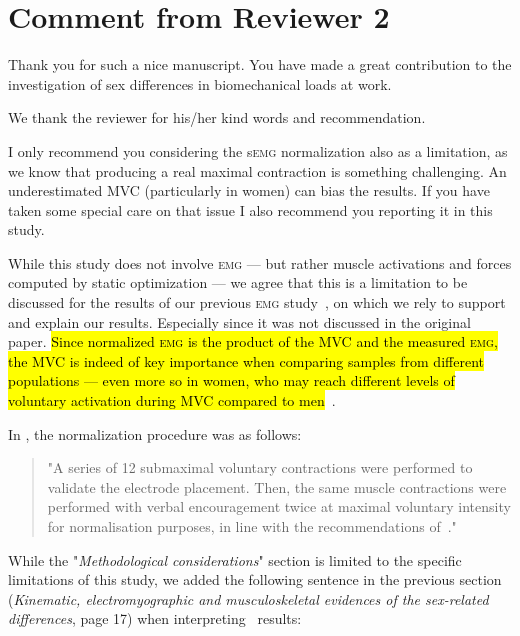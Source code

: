 \documentclass[preprint,review,12pt]{elsarticle}
\DeclareRobustCommand{\hlcyan}[1]{{\sethlcolor{cyan}\hl{#1}}}
\begin{document}
    \section{Comment from Reviewer 2}\label{sec:reviewer-2}

    \begin{formal}
        Thank you for such a nice manuscript.
        You have made a great contribution to the investigation of sex differences in biomechanical loads at work.
    \end{formal}

    We thank the reviewer for his/her kind words and recommendation.

    \begin{formal}
        I only recommend you considering the s\textsc{emg} normalization also as a limitation, as we know that producing a real maximal contraction is something challenging.
        An underestimated MVC (particularly in women) can bias the results.
        If you have taken some special care on that issue I also recommend you reporting it in this study.
    \end{formal}

    While this study does not involve \textsc{emg} --- but rather muscle activations and forces computed by static optimization --- we agree that this is a limitation to be discussed for the results of our previous \textsc{emg} study~\citep{Bouffard2019-fd}, on which we rely to support and explain our results.
    Especially since it was not discussed in the original paper.
    \hlcyan{Since normalized \textsc{emg} is the product of the MVC and the measured \textsc{emg}, the MVC is indeed of key importance when comparing samples from different populations --- even more so in women, who may reach different levels of voluntary activation during MVC compared to men}~\citep{Ema2018-cd, Inglis2013-uq}.

    In \citet{Bouffard2019-fd}, the normalization procedure was as follows:
    \begin{quote}
        "A series of 12 submaximal voluntary contractions were performed to validate the electrode placement.
        Then, the same muscle contractions were performed with verbal encouragement twice at maximal voluntary intensity for normalisation purposes, in line with the recommendations of~\citet{Dal_Maso2016-wh}."
    \end{quote}

    While the "\textit{Methodological considerations}" section is limited to the specific limitations of this study, we added the following sentence in the previous section (\textit{Kinematic, electromyographic and musculoskeletal evidences of the sex-related differences}, page 17) when interpreting~\citet{Bouffard2019-fd} results:
\end{document}
